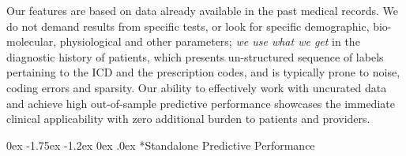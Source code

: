 \documentclass[onecolumn, compsoc,11pt]{IEEEtran}
\makeatletter
\renewcommand\subsection{\@startsection {subsection}{2}{\z@}%
                                   {0ex \@plus -1.75ex \@minus -1.2ex}%
                                   {0ex \@plus.0ex}%
                                   {\fontsize{11}{11}\selectfont\bfseries\sffamily\color{black}}}
\makeatother
\begin{document}
Our features are  based on data already  available in the past  medical records. We do not demand results from specific tests, or look for specific demographic, bio-molecular, physiological and other parameters; \textit{we use what we get} in the diagnostic history of patients, which presents un-structured sequence of labels pertaining to the ICD and the prescription codes, and is typically prone to noise, coding errors and sparsity. Our ability to effectively work with uncurated data and  achieve high out-of-sample predictive performance   showcases the  immediate clinical  applicability with zero additional burden to patients and providers.


%
\subsection*{Standalone Predictive Performance}
\def\RCOL{\rowcolor{teal!40}}
\end{document}
